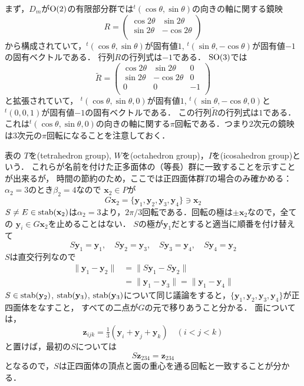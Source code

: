 まず，$D_m$が$\operatorname{O}(2)$の有限部分群では${}^t(\cos\theta,\sin\theta)$の向きの軸に関する鏡映
\[
     R
     =
     \begin{pmatrix}
          \cos 2\theta &\sin 2\theta\\
          \sin 2\theta&-\cos 2\theta\\
     \end{pmatrix}
\]
から構成されていて，${}^t(\cos\theta,\sin\theta)$が固有値$1$, ${}^t(\sin\theta,-\cos\theta)$が固有値$-1$の固有ベクトルである．
行列$R$の行列式は$-1$である．
$\operatorname{SO}(3)$では
\[
     \tilde R
     =
     \begin{pmatrix}
          \cos 2\theta &\sin 2\theta&0\\
          \sin 2\theta&-\cos 2\theta&0\\
          0&0&-1\\
     \end{pmatrix}
\]
と拡張されていて，
${}^t(\cos\theta,\sin\theta,0)$が固有値$1$, 
${}^t(\sin\theta,-\cos\theta,0)$と ${}^t(0,0,1)$が固有値$-1$の固有ベクトルである．
この行列$\tilde R$の行列式は$1$である．
これは${}^t(\cos\theta,\sin\theta,0)$の向きの軸に関する$\pi$回転である．つまり$2$次元の鏡映は$3$次元の$\pi$回転になることを注意しておく．

表の
$T$を(tetrahedron group), $W$を(octahedron group)，$I$を(icosahedron group)という．
これらが名前を付けた正多面体の（等長）群に一致することを示すことが出来るが，
時間の節約のため，ここでは正四面体群$T$の場合のみ確かめる：
$\alpha_2=3$のとき$\beta_2=4$なので $\mathbf x_2\in P$が
\[
     G\mathbf x_2
     =
     \{\mathbf y_1, \mathbf y_2,\mathbf y_3,\mathbf y_4\}
     \ni \mathbf x_2
\]
$S\neq E\in \operatorname{stab}(\mathbf x_2)$は$\alpha_2=3$より，$2\pi/3$回転である．回転の極は$\pm \mathbf x_2$なので，全ての
$\mathbf y_i\in G\mathbf x_2$を止めることはない．
$S$の極が$\mathbf y_1$だとすると適当に順番を付け替えて
\[
     S\mathbf y_1=\mathbf y_1,\quad
     S\mathbf y_2=\mathbf y_3,\quad
     S\mathbf y_3=\mathbf y_4,\quad
     S\mathbf y_4=\mathbf y_2
\]
$S$は直交行列なので
\[
\begin{split}
     \|\mathbf y_1-\mathbf y_2\|
     &=
     \|S\mathbf y_1-S\mathbf y_2\|\\
     &=
     \|\mathbf y_1-\mathbf y_3\|
     =
     \|\mathbf y_1-\mathbf y_4\|
\end{split}
\]
$S\in \operatorname{stab}(\mathbf y_2)$, $\operatorname{stab}(\mathbf y_3)$, $\operatorname{stab}(\mathbf y_3)$について同じ議論をすると，$\{\mathbf y_1, \mathbf y_2,\mathbf y_3,\mathbf y_4\}$が正四面体をなすこと，
すべての二点が$G$の元で移りあうこと分かる．
面については，
\[
     \mathbf z_{ijk}=\tfrac13(\mathbf y_i+\mathbf y_j+\mathbf y_k)\quad (i< j<k)
\]
と置けば，最初の$S$については
\[
     S\mathbf z_{234}=\mathbf z_{234}
\]
となるので，$S$は正四面体の頂点と面の重心を通る回転と一致することが分かる．

